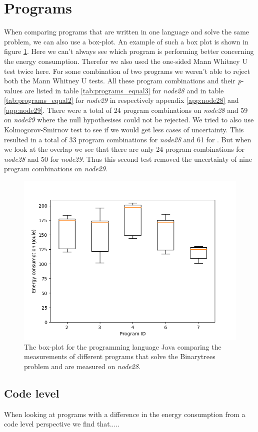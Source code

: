 \section{Programs}
When comparing programs that are written in one language and solve the same problem, we can also use a box-plot. An example of such a box plot is shown in figure \ref{fig:box-lang}. Here we can't always see which program is performing better concerning the energy consumption. Therefor we also used the one-sided Mann Whitney U test twice here. For some combination of two programs we weren't able to reject both the Mann Whitney U tests. All these program combinations and their \textit{p}-values are listed in table \ref{tab:programs_equal3} for \textit{node28} and in table \ref{tab:programs_equal2} for \textit{node29} in respectively appendix \ref{app:node28} and \ref{app:node29}. There were a total of 24 program combinations on \textit{node28} and 59 on \textit{node29} where the null hypothesises could not be rejected. We tried to also use Kolmogorov-Smirnov test to see if we would get less cases of uncertainty. This resulted in a total of 33 program combinations for \textit{node28} and 61 for . But when we look at the overlap we see that there are only 24 program combinations for \textit{node28} and 50 for \textit{node29}. Thus this second test removed the uncertainty of nine program combinations on \textit{node29}.

\begin{figure}[h]
    \centering
    \includegraphics[width=.6\textwidth]{graphs/BOXGroup-java-problem0-3.png}
    \caption{The box-plot for the programming language Java comparing the measurements of different programs that solve the Binarytrees problem and are measured on \textit{node28}.}
    \label{fig:box-lang}
\end{figure}

\subsection{Code level}
When looking at programs with a difference in the energy consumption from a code level perspective we find that.....

